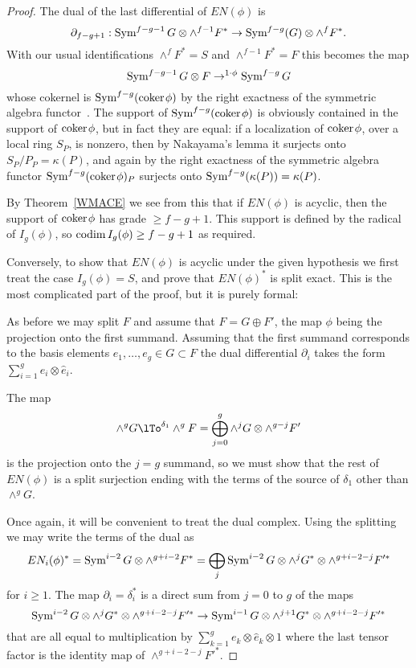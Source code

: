 \begin{proof}
The dual of the last differential of $EN(\phi)$ is
$$
\partial_{f-g+1}: \operatorname{Sym}^{f-g-1}G \otimes \wedge^{f-1}F^{*} \to \operatorname{Sym}^{f-g}(G) \otimes \wedge^{f}F^{*}.
$$ 
With our usual identifications $\wedge^{f}F^{*} = S$ and $\wedge^{f-1}F^{*} = F$ this becomes the map
$$
\operatorname{Sym}^{f-g-1}G \otimes F \to^{1\cdot \phi} \operatorname{Sym}^{f-g}G
$$
whose cokernel is $\operatorname{Sym}^{f-g}({\rm{coker}\kern1pt} \phi)$ by the right exactness of the symmetric algebra functor~\cite[Proposition A2.2]{Eisenbud1995}. The support of $\operatorname{Sym}^{f-g}({\rm{coker}\kern1pt} \phi)$ is obviously contained in the support
of ${\rm{coker}\kern1pt} \phi$, but in fact they are equal: if a localization of ${\rm{coker}\kern1pt} \phi$, over a local ring $S_{P}$,
 is nonzero, then by
Nakayama's lemma it surjects onto $S_{P}/P_{P} = \kappa(P)$, and again by the right exactness
of the symmetric algebra functor $\operatorname{Sym}^{f-g}({\rm{coker}\kern1pt} \phi)_{P}$ surjects onto $\operatorname{Sym}^{f-g}(\kappa(P)) = \kappa(P)$.

By Theorem~\ref{WMACE} we see from this that if $EN(\phi)$ is acyclic, then the support of ${\rm{coker}\kern1pt} \phi$
has grade $\geq f-g+1$. This support is defined by the radical of $I_{g}(\phi)$, so $\operatorname{codim} I_{g}(\phi)\geq f-g+1$ as required.

Conversely, to show that $EN(\phi)$ is acyclic under the given hypothesis we first treat the case
$I_{g}(\phi) = S$, and prove that $EN(\phi)^{*}$ is split exact. This is the most complicated part of the proof,
but it is purely formal:

As before we may split $F$ and
assume that $F = G\oplus F'$, the map $\phi$ being the projection onto the first summand.
Assuming that the first summand corresponds to the basis elements $e_{1}, \dots, e_{g}\in G\subset F$
the dual differential $\partial_{i}$ takes the form $\sum_{i=1}^{g} e_{i}\otimes \hat e_{i}$.

The map 
$$
\wedge^{g}G\lTo^{\delta_{1}} 
\wedge^{g}F =\bigoplus_{j=0}^{g}\wedge^{j}G\otimes \wedge^{g-j}F'
$$ 
is the projection onto the $j=g$ summand, so we must show that the rest of $EN(\phi)$ is a split surjection
ending with the terms of the source of $\delta_{1}$ other than $\wedge^{g}G$.

Once again, it will be convenient to treat the dual complex. Using the splitting
we may write the terms of the dual as
$$
EN_{i}(\phi)^{*} = \operatorname{Sym}^{i-2}G \otimes  \wedge^{g+i-2}F^{*}  = 
\bigoplus_{j} \operatorname{Sym}^{i-2}G \otimes  \wedge^{j}G^{*} \otimes \wedge^{g+i-2-j}F'^{*}
$$
for $i\geq 1$.
The map $\partial_{i}= \delta_{i}^{*}$ is a direct sum from $j=0$ to $g$ of the maps 
$$
\operatorname{Sym}^{i-2}G \otimes  \wedge^{j}G^{*} \otimes \wedge^{g+i-2-j}F'^{*}
\to
\operatorname{Sym}^{i-1}G \otimes  \wedge^{j+1}G^{*} \otimes \wedge^{g+i-2-j}F'^{*}
$$
that are all equal to  multiplication by $\sum_{k=1}^{g} e_{k}\otimes \hat e_{k}\otimes 1$
where the last tensor factor is the identity map of $\wedge^{g+i-2-j}F'^{*}$.


\end{proof}
